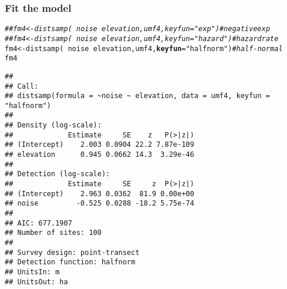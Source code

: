 \documentclass[color=usenames,dvipsnames]{beamer}\usepackage[]{graphicx}\usepackage[]{xcolor}
\makeatletter
\newcommand{\hlsng}[1]{\textcolor[rgb]{0.749,0.012,0.012}{#1}}%
\newcommand{\hlcom}[1]{\textcolor[rgb]{0.514,0.506,0.514}{\textit{#1}}}%
\newcommand{\hlopt}[1]{\textcolor[rgb]{0,0,0}{#1}}%
\newcommand{\hldef}[1]{\textcolor[rgb]{0,0,0}{#1}}%
\newcommand{\hlkwb}[1]{\textcolor[rgb]{0,0.341,0.682}{#1}}%
\newcommand{\hlkwc}[1]{\textcolor[rgb]{0,0,0}{\textbf{#1}}}%
\newcommand{\hlkwd}[1]{\textcolor[rgb]{0.004,0.004,0.506}{#1}}%
\newenvironment{kframe}{%
 \def\at@end@of@kframe{}%
 \ifinner\ifhmode%
  \def\at@end@of@kframe{\end{minipage}}%
  \begin{minipage}{\columnwidth}%
 \fi\fi%
 \def\FrameCommand##1{\hskip\@totalleftmargin \hskip-\fboxsep
 \colorbox{shadecolor}{##1}\hskip-\fboxsep
     \hskip-\linewidth \hskip-\@totalleftmargin \hskip\columnwidth}%
 \MakeFramed {\advance\hsize-\width
   \@totalleftmargin\z@ \linewidth\hsize
   \@setminipage}}%
 {\par\unskip\endMakeFramed%
 \at@end@of@kframe}
\newenvironment{knitrout}{}{} %
\makeatother
\begin{document}
\begin{frame}[fragile]
  \frametitle{Fit the model}
  \footnotesize
\begin{knitrout}\tiny
{}\color{fgcolor}\begin{kframe}
\begin{alltt}
\hlcom{## fm4 <- distsamp(~noise ~elevation, umf4, keyfun="exp")     # negative exp}
\hlcom{## fm4 <- distsamp(~noise ~elevation, umf4, keyfun="hazard")  # hazard rate}
\hldef{fm4} \hlkwb{<-} \hlkwd{distsamp}\hldef{(}\hlopt{~}\hldef{noise} \hlopt{~}\hldef{elevation, umf4,} \hlkwc{keyfun}\hldef{=}\hlsng{"halfnorm"}\hldef{)}   \hlcom{# half-normal}
\hldef{fm4}
\end{alltt}
\begin{verbatim}
## 
## Call:
## distsamp(formula = ~noise ~ elevation, data = umf4, keyfun = "halfnorm")
## 
## Density (log-scale):
##             Estimate     SE    z   P(>|z|)
## (Intercept)    2.003 0.0904 22.2 7.87e-109
## elevation      0.945 0.0662 14.3  3.29e-46
## 
## Detection (log-scale):
##             Estimate     SE     z  P(>|z|)
## (Intercept)    2.963 0.0362  81.9 0.00e+00
## noise         -0.525 0.0288 -18.2 5.75e-74
## 
## AIC: 677.1907 
## Number of sites: 100
## 
## Survey design: point-transect
## Detection function: halfnorm
## UnitsIn: m
## UnitsOut: ha
\end{verbatim}
\end{kframe}
\end{knitrout}
\end{frame}
\end{document}

